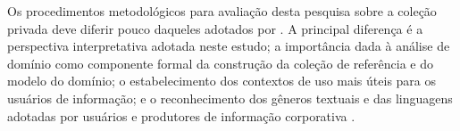 Os procedimentos metodológicos para avaliação desta pesquisa sobre a coleção privada deve diferir pouco daqueles adotados por . A principal diferença é a perspectiva interpretativa adotada neste estudo; a importância dada à análise de domínio como componente formal da construção da coleção de referência e do modelo do domínio; o estabelecimento dos contextos de uso mais úteis para os usuários de informação; e o reconhecimento dos gêneros textuais e das linguagens adotadas por usuários e produtores de informação corporativa \cite{lykke2011domain}.





























